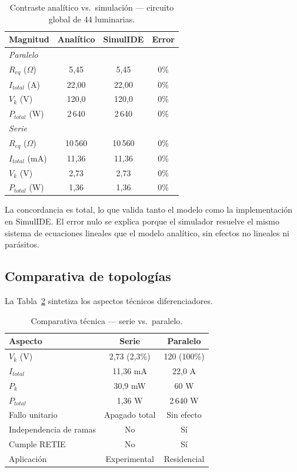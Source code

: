 \begin{table}[H]
\centering
\caption{Contraste analítico vs.\ simulación — circuito global de 44 luminarias.}
\label{tab:contraste}
\begin{tabular}{lccc}
\toprule
\textbf{Magnitud} & \textbf{Analítico} & \textbf{SimulIDE} & \textbf{Error} \\
\midrule
\multicolumn{4}{l}{\textit{Paralelo}} \\
$R_{eq}$ ($\Omega$)    & 5{,}45   & 5{,}45   & 0\% \\
$I_{total}$ (A)        & 22{,}00  & 22{,}00  & 0\% \\
$V_k$ (V)              & 120{,}0  & 120{,}0  & 0\% \\
$P_{total}$ (W)        & 2\,640   & 2\,640   & 0\% \\
\midrule
\multicolumn{4}{l}{\textit{Serie}} \\
$R_{eq}$ ($\Omega$)    & 10\,560  & 10\,560  & 0\% \\
$I_{total}$ (mA)       & 11{,}36  & 11{,}36  & 0\% \\
$V_k$ (V)              & 2{,}73   & 2{,}73   & 0\% \\
$P_{total}$ (W)        & 1{,}36   & 1{,}36   & 0\% \\
\bottomrule
\end{tabular}
\end{table}

La concordancia es total, lo que valida tanto el modelo como la implementación en SimulIDE. El error nulo se explica porque el simulador resuelve el mismo sistema de ecuaciones lineales que el modelo analítico, sin efectos no lineales ni parásitos.

\subsection{Comparativa de topologías}

La Tabla~\ref{tab:comparativa} sintetiza los aspectos técnicos diferenciadores.

\begin{table}[H]
\centering
\caption{Comparativa técnica — serie vs.\ paralelo.}
\label{tab:comparativa}
\begin{tabular}{lcc}
\toprule
\textbf{Aspecto} & \textbf{Serie} & \textbf{Paralelo} \\
\midrule
$V_k$ (V)                & 2{,}73 (2{,}3\%) & 120 (100\%)  \\
$I_{total}$              & 11{,}36 mA       & 22{,}0 A     \\
$P_k$                    & 30{,}9 mW        & 60 W         \\
$P_{total}$              & 1{,}36 W         & 2\,640 W     \\
Fallo unitario           & Apagado total    & Sin efecto   \\
Independencia de ramas   & No               & Sí           \\
Cumple RETIE             & No               & Sí           \\
Aplicación              & Experimental     & Residencial  \\
\bottomrule
\end{tabular}
\end{table}

